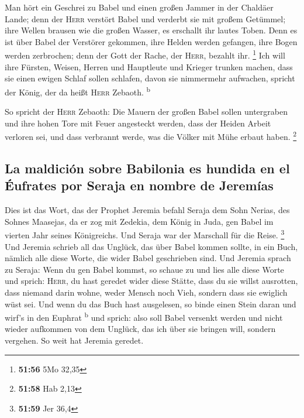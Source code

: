  Man hört ein Geschrei zu Babel und einen großen Jammer
in der Chaldäer Lande;  denn der \textsc{Herr} verstört
Babel und verderbt sie mit großem Getümmel; ihre Wellen brausen wie die
großen Wasser, es erschallt ihr lautes Toben.  Denn es
ist über Babel der Verstörer gekommen, ihre Helden werden gefangen, ihre
Bogen werden zerbrochen; denn der Gott der Rache, der \textsc{Herr},
bezahlt ihr. \footnote{\textbf{51:56} 5Mo 32,35}  Ich
will ihre Fürsten, Weisen, Herren und Hauptleute und Krieger trunken
machen, dass sie einen ewigen Schlaf sollen schlafen, davon sie
nimmermehr aufwachen, spricht der König, der da heißt \textsc{Herr}
Zebaoth. \textsuperscript{b}

 So spricht der \textsc{Herr} Zebaoth: Die Mauern der
großen Babel sollen untergraben und ihre hohen Tore mit Feuer angesteckt
werden, dass der Heiden Arbeit verloren sei, und dass verbrannt werde,
was die Völker mit Mühe erbaut haben. \footnote{\textbf{51:58} Hab 2,13}

\hypertarget{la-maldiciuxf3n-sobre-babilonia-es-hundida-en-el-uxe9ufrates-por-seraja-en-nombre-de-jeremuxedas}{%
\subsection{La maldición sobre Babilonia es hundida en el Éufrates por
Seraja en nombre de
Jeremías}\label{la-maldiciuxf3n-sobre-babilonia-es-hundida-en-el-uxe9ufrates-por-seraja-en-nombre-de-jeremuxedas}}

 Dies ist das Wort, das der Prophet Jeremia befahl Seraja
dem Sohn Nerias, des Sohnes Maasejas, da er zog mit Zedekia, dem König
in Juda, gen Babel im vierten Jahr seines Königreichs. Und Seraja war
der Marschall für die Reise. \footnote{\textbf{51:59} Jer 36,4}
 Und Jeremia schrieb all das Unglück, das über Babel
kommen sollte, in ein Buch, nämlich alle diese Worte, die wider Babel
geschrieben sind.  Und Jeremia sprach zu Seraja: Wenn du
gen Babel kommst, so schaue zu und lies alle diese Worte 
und sprich: \textsc{Herr}, du hast geredet wider diese Stätte, dass du
sie willst ausrotten, dass niemand darin wohne, weder Mensch noch Vieh,
sondern dass sie ewiglich wüst sei.  Und wenn du das Buch
hast ausgelesen, so binde einen Stein daran und wirf's in den Euphrat
\textsuperscript{b}  und sprich: also soll Babel versenkt
werden und nicht wieder aufkommen von dem Unglück, das ich über sie
bringen will, sondern vergehen. So weit hat Jeremia geredet.

